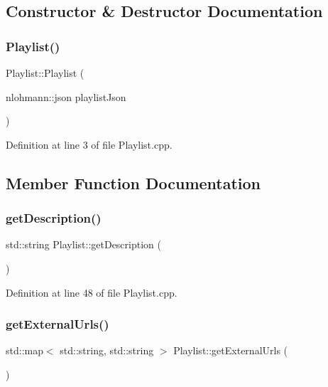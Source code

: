 \subsection{Constructor \& Destructor Documentation}
\mbox{\label{class_playlist_a400993e8e6892a6ad3631dfaacf63d49}} 
\subsubsection{\texorpdfstring{Playlist()}{Playlist()}}
{\footnotesize\ttfamily Playlist\+::\+Playlist (\begin{DoxyParamCaption}\item[{nlohmann\+::json}]{playlist\+Json }\end{DoxyParamCaption})}



Definition at line 3 of file Playlist.\+cpp.



\subsection{Member Function Documentation}
\mbox{\label{class_playlist_ab7e32c20228475b77010332718af56a8}} 
\subsubsection{\texorpdfstring{get\+Description()}{getDescription()}}
{\footnotesize\ttfamily std\+::string Playlist\+::get\+Description (\begin{DoxyParamCaption}{ }\end{DoxyParamCaption})}



Definition at line 48 of file Playlist.\+cpp.

\mbox{\label{class_playlist_aed089de43cb58f23f600a47f98dcaaff}} 
\subsubsection{\texorpdfstring{get\+External\+Urls()}{getExternalUrls()}}
{\footnotesize\ttfamily std\+::map$<$ std\+::string, std\+::string $>$ Playlist\+::get\+External\+Urls (\begin{DoxyParamCaption}{ }\end{DoxyParamCaption})}



